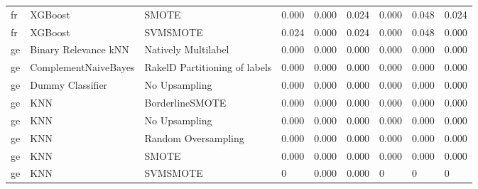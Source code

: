 \begin{tabular}{lllllllll}
      fr &                         XGBoost &                         SMOTE &     0.000 &                     0.000 &                 0.024 &                  0.000 &                                   0.048 &     0.024 \\
      fr &                         XGBoost &                      SVMSMOTE &     0.024 &                     0.000 &                 0.024 &                  0.000 &                                   0.048 &     0.000 \\
      ge &            Binary Relevance kNN &           Natively Multilabel &     0.000 &                     0.000 &                 0.000 &                  0.000 &                                   0.000 &     0.000 \\
      ge &            ComplementNaiveBayes & RakelD Partitioning of labels &     0.000 &                     0.000 &                 0.000 &                  0.000 &                                   0.000 &     0.000 \\
      ge &                Dummy Classifier &                 No Upsampling &     0.000 &                     0.000 &                 0.000 &                  0.000 &                                   0.000 &     0.000 \\
      ge &                             KNN &               BorderlineSMOTE &     0.000 &                     0.000 &                 0.000 &                  0.000 &                                   0.000 &     0.000 \\
      ge &                             KNN &                 No Upsampling &     0.000 &                     0.000 &                 0.000 &                  0.000 &                                   0.000 &     0.000 \\
      ge &                             KNN &           Random Oversampling &     0.000 &                     0.000 &                 0.000 &                  0.000 &                                   0.000 &     0.000 \\
      ge &                             KNN &                         SMOTE &     0.000 &                     0.000 &                 0.000 &                  0.000 &                                   0.000 &     0.000 \\
      ge &                             KNN &                      SVMSMOTE &         0 &                     0.000 &                 0.000 &                      0 &                                       0 &         0 \\

\end{tabular}
